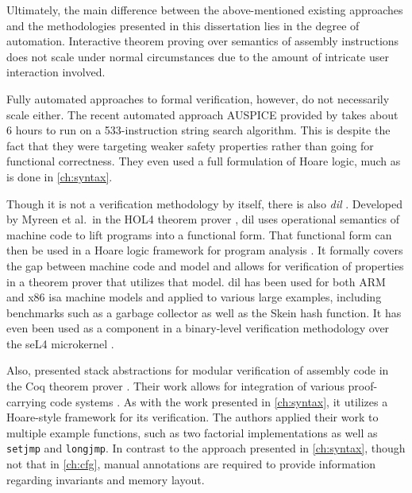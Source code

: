 Ultimately, the main difference between the above-mentioned existing approaches
and the methodologies presented in this dissertation lies in the degree of automation.
Interactive theorem proving over semantics of assembly instructions
does not scale under normal circumstances
due to the amount of intricate user interaction involved.

Fully automated approaches to formal verification, however, do not necessarily scale either.
The recent automated approach AUSPICE provided by \textcite{tan2015auspice}
takes about 6 hours to run on a 533-instruction string search algorithm.
This is despite the fact that they were targeting weaker safety properties
rather than going for functional correctness.
They even used a full formulation of Hoare logic, much as is done in \cref{ch:syntax}.

Though it is not a verification methodology by itself,
there is also \emph{\ac{dil}} \autocite{myreen2008decompilation,myreen2012decompilation}.
Developed by Myreen et al.\ in the HOL4 theorem prover \autocite{slind2008brief},
\ac{dil} uses operational semantics of machine code
to lift programs into a functional form.
That functional form can then be used in a Hoare logic framework
for program analysis \autocite{myreen2007hoare}.
It formally covers the gap between machine code and  model
and allows for verification of properties in a theorem prover that utilizes that model.
\Ac{dil} has been used for both ARM and x86 \ac{isa} machine models
and applied to various large examples,
including benchmarks such as a garbage collector as well as the Skein hash function.
It has even been used as a component
in a binary-level verification methodology over the seL4 microkernel \autocite{sewell2013tvv}.

Also, \textcite{feng2006modular,feng2005sbca} presented stack abstractions
for modular verification of assembly code
in the Coq theorem prover \autocite{chlipala2013certified}.
Their work allows for integration
of various proof-carrying code systems \autocite{necula1997proof}.
As with the work presented in \cref{ch:syntax},
it utilizes a Hoare-style framework for its verification.
The authors applied their work to multiple example functions,
such as two factorial implementations
as well as \lstinline[style=C]|setjmp| and \lstinline[style=C]|longjmp|.
In contrast to the approach presented in \cref{ch:syntax},
though not that in \cref{ch:cfg},
manual annotations are required to provide information
regarding invariants and memory layout.

